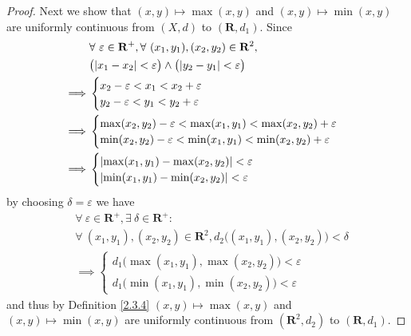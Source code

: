 \begin{proof}
    Next we show that \((x, y) \mapsto \max(x, y)\) and \((x, y) \mapsto \min(x, y)\) are uniformly continuous from \((X, d)\) to \((\mathbf{R}, d_1)\).
    Since
    \begin{align*}
                 & \forall\ \varepsilon \in \mathbf{R}^+, \forall\ (x_1, y_1), (x_2, y_2) \in \mathbf{R}^2, \\
                 & \big(\abs*{x_1 - x_2} < \varepsilon\big) \land \big(\abs*{y_2 - y_1} < \varepsilon\big)  \\
        \implies & \begin{cases}
            x_2 - \varepsilon < x_1 < x_2 + \varepsilon \\
            y_2 - \varepsilon < y_1 < y_2 + \varepsilon \\
        \end{cases}                                                               \\
        \implies & \begin{cases}
            \max(x_2, y_2) - \varepsilon < \max(x_1, y_1) < \max(x_2, y_2) + \varepsilon \\
            \min(x_2, y_2) - \varepsilon < \min(x_1, y_1) < \min(x_2, y_2) + \varepsilon
        \end{cases}                                                               \\
        \implies & \begin{cases}
            \abs*{\max(x_1, y_1) - \max(x_2, y_2)} < \varepsilon \\
            \abs*{\min(x_1, y_1) - \min(x_2, y_2)} < \varepsilon
        \end{cases}
    \end{align*}
    by choosing \(\delta = \varepsilon\) we have
    \begin{align*}
         & \forall\ \varepsilon \in \mathbf{R}^+, \exists\ \delta \in \mathbf{R}^+ :                      \\
         & \forall\ (x_1, y_1), (x_2, y_2) \in \mathbf{R}^2, d_2\big((x_1, y_1), (x_2, y_2)\big) < \delta \\
         & \implies \begin{cases}
            d_1\big(\max(x_1, y_1), \max(x_2, y_2)\big) < \varepsilon \\
            d_1\big(\min(x_1, y_1), \min(x_2, y_2)\big) < \varepsilon
        \end{cases}
    \end{align*}
    and thus by Definition \ref{2.3.4} \((x, y) \mapsto \max(x, y)\) and \((x, y) \mapsto \min(x, y)\) are uniformly continuous from \((\mathbf{R}^2, d_2)\) to \((\mathbf{R}, d_1)\).


\end{proof}
